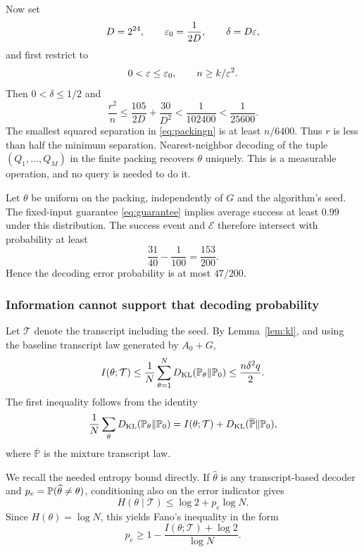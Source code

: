 Now set
\begin{equation}\label{eq:constants}
 D=2^{24},\qquad \varepsilon_0=\frac1{2D},\qquad \delta=D\varepsilon,
\end{equation}
and first restrict to
\begin{equation}\label{eq:coregime}
 0<\varepsilon\le\varepsilon_0,\qquad n\ge k/\varepsilon^2.
\end{equation}
Then $0<\delta\le1/2$ and
\begin{equation}\label{eq:smallradius}
 \frac{r^2}{n}\le\frac{105}{2D}+\frac{30}{D^2}
 <\frac1{102400}<\frac1{25600}.
\end{equation}
The smallest squared separation in \eqref{eq:packingn} is at least $n/6400$.
Thus $r$ is less than half the minimum separation. Nearest-neighbor decoding
of the tuple $(Q_1,\ldots,Q_M)$ in the finite packing recovers $\theta$
uniquely. This is a measurable operation, and no query is needed to do it.

Let $\theta$ be uniform on the packing, independently of $G$ and the algorithm's
seed. The fixed-input guarantee \eqref{eq:guarantee} implies average success
at least $0.99$ under this distribution. The success event and $\mathcal E$
therefore intersect with probability at least
\begin{equation}\label{eq:decodeprob}
 \frac{31}{40}-\frac1{100}=\frac{153}{200}.
\end{equation}
Hence the decoding error probability is at most $47/200$.

\subsubsection{Information cannot support that decoding probability}

Let $\mathcal T$ denote the transcript including the seed. By
Lemma~\ref{lem:kl}, and using the baseline transcript law generated by $A_0+G$,
\begin{equation}\label{eq:mutualinfo}
 I(\theta;\mathcal T)
 \le\frac1N\sum_{\theta=1}^N
       D_{\mathrm{KL}}(\mathbb P_\theta\Vert\mathbb P_0)
 \le\frac{n\delta^2q}{2}.
\end{equation}
The first inequality follows from the identity
\[
 \frac1N\sum_\theta D_{\mathrm{KL}}(\mathbb P_\theta\Vert\mathbb P_0)
 =I(\theta;\mathcal T)+D_{\mathrm{KL}}(\overline{\mathbb P}\Vert\mathbb P_0),
\]
where $\overline{\mathbb P}$ is the mixture transcript law.

We recall the needed entropy bound directly. If $\widehat\theta$ is any
transcript-based decoder and $p_e=\mathbb P(\widehat\theta\ne\theta)$, conditioning
also on the error indicator gives
\[
 H(\theta\mid\mathcal T)\le\log2+p_e\log N.
\]
Since $H(\theta)=\log N$, this yields Fano's inequality in the form
\begin{equation}\label{eq:fano}
 p_e\ge1-\frac{I(\theta;\mathcal T)+\log2}{\log N}.
\end{equation}

